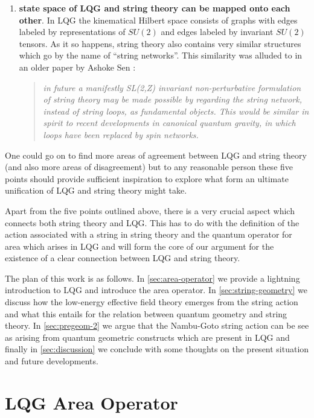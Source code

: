 \documentclass[11pt,a4paper,nofootinbib]{revtex4-1}
\begin{document}
\begin{enumerate}
	\item \textbf{state space of LQG and string theory can be mapped onto each other}. In LQG the kinematical Hilbert space consists of graphs with edges labeled by representations of $ SU(2) $ and edges labeled by invariant $ SU(2) $ tensors. As it so happens, string theory also contains very similar structures which go by the name of ``string networks''. This similarity was alluded to in an older paper by Ashoke Sen \cite{Sen1997String}:
	\begin{quote}
		\emph{in future a manifestly SL(2,Z) invariant non-perturbative formulation of string theory may be made possible by regarding the string network, instead of string loops, as fundamental objects. This would be similar in spirit to recent developments in canonical quantum gravity, in which loops have been replaced by spin networks.}
	\end{quote}
\end{enumerate}

One could go on to find more areas of agreement between LQG and string theory (and also more areas of disagreement) but to any reasonable person these five points should provide sufficient inspiration to explore what form an ultimate unification of LQG and string theory might take.

Apart from the five points outlined above, there is a very crucial aspect which connects both string theory and LQG. This has to do with the definition of the action associated with a string in string theory and the quantum operator for area which arises in LQG and will form the core of our argument for the existence of a clear connection between LQG and string theory.

The plan of this work is as follows. In \autoref{sec:area-operator} we provide a lightning introduction to LQG and introduce the area operator. In \autoref{sec:string-geometry} we discuss how the low-energy effective field theory emerges from the string action and what this entails for the relation between quantum geometry and string theory. In \autoref{sec:pregeom-2} we argue that the Nambu-Goto string action can be see as arising from quantum geometric constructs which are present in LQG and finally in \autoref{sec:discussion} we conclude with some thoughts on the present situation and future developments.

\section{LQG Area Operator}\label{sec:area-operator}
\end{document}
